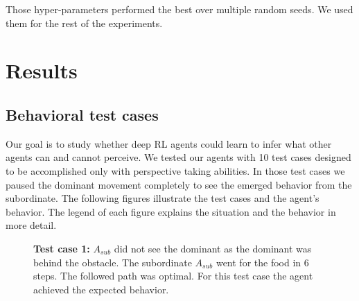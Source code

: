 \documentclass{article}
\begin{document}
Those hyper-parameters performed the best over multiple random seeds. We used them for the rest of the experiments.

\section{Results}

\subsection{Behavioral test cases}
Our goal is to study whether deep RL agents could learn to infer what other agents can and cannot perceive. We tested our agents with 10 test cases designed to be accomplished only with perspective taking abilities. In those test cases we paused the dominant movement completely to see the emerged behavior from the subordinate. The following figures illustrate the test cases and the agent's behavior. The legend of each figure explains the situation and the behavior in more detail.

\begin{figure}[H]
    \centering
    \caption{\textbf {Test  case 1:} \(A_{sub}\) did not see the dominant as the dominant was behind the obstacle. The subordinate \(A_{sub}\) went for the food in 6 steps. The followed path was optimal.  For this test case the agent achieved the expected behavior.}
    \label{fig.tc.1}
\end{figure}
\end{document}
